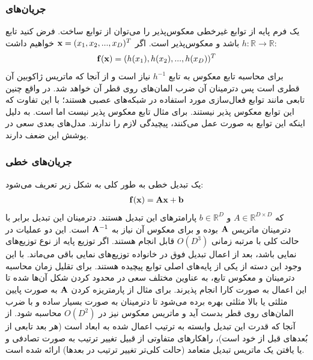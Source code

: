 \subsubsection{جریان‌های
	}
یک فرم پایه از توابع غیرخطی معکوس‌پذیر را می‌توان از توابع \elementwise{} ساخت. فرض کنید تابع
$h: \mathbb{R} \rightarrow \mathbb{R}$
باشد و معکوس‌پذیر است. اگر
${\bf x} = (x_1, x_2, ..., x_D)^T$
خواهیم داشت:
\begin{gather}
	{\bf f}({\bf x}) = (h(x_1), h(x_2), ..., h(x_D))^T
\end{gather}
برای محاسبه تابع معکوس به تابع $h^{-1}$ نیاز است و از آنجا که ماتریس ژاکوبین آن قطری است پس دترمینان آن ضرب المان‌های روی قطر آن خواهد شد. در واقع چنین تابعی مانند توابع فعال‌سازی مورد استفاده در شبکه‌های عصبی هستند؛ با این تفاوت که این توابع معکوس پذیر نیستند. برای مثال تابع  معکوس پذیر نیست اما  است. به دلیل اینکه این توابع به صورت \elementwise{} عمل می‌کنند، پیچیدگی لازم را ندارند. مدل‌های بعدی سعی در پوشش این ضعف دارند.
\subsubsection{جریان‌های خطی}
یک تبدیل خطی به طور کلی به شکل زیر تعریف می‌شود:
\begin{align}
	{\bf f}({\bf x}) = {\bf A}{\bf x} + {\bf b}
\end{align}
که $A \in \mathbb{R}^{D \times D}$ و $b \in \mathbb{R}^D$ پارامتر‌های این تبدیل هستند. دترمینان این تبدیل برابر با دترمینان ماتریس ${\bf A}$ بوده و برای معکوس آن نیاز به ${\bf A}^{-1}$ است.
این دو عملیات در حالت کلی با مرتبه زمانی
$O(D^3)$
قابل انجام هستند. اگر توزیع پایه از نوع توزیع‌های نمایی باشد، بعد از اعمال تبدیل فوق در خانواده توزیع‌های نمایی باقی می‌ماند. با این وجود این دسته از یکی از پایه‌های اصلی توابع پیچیده هستند. برای تقلیل زمان محاسبه دترمینان و معکوس تابع، به عناوین مختلف سعی در محدود کردن شکل آن‌ها شده تا این اعمال به صورت کارا انجام پذیرند. برای مثال از پارمتریزه کردن ${\bf A}$ به صورت پایین مثلثی یا بالا مثلثی بهره برده می‌شود تا دترمینان به صورت بسیار ساده و با ضرب المان‌های روی قطر بدست آید و ماتریس معکوس نیز در $O(D^2)$ محاسبه شود. از آنجا که قدرت این تبدیل وابسته به ترتیب اعمال شده به ابعاد است (هر بعد تابعی از بُعدهای قبل از خود است)، راهکارهای متفاوتی از قبیل تغییر ترتیب به صورت تصادفی و یا یافتن یک ماتریس تبدیل متعامد (حالت کلی‌تر تغییر ترتیب در بعدها) ارائه شده است.
